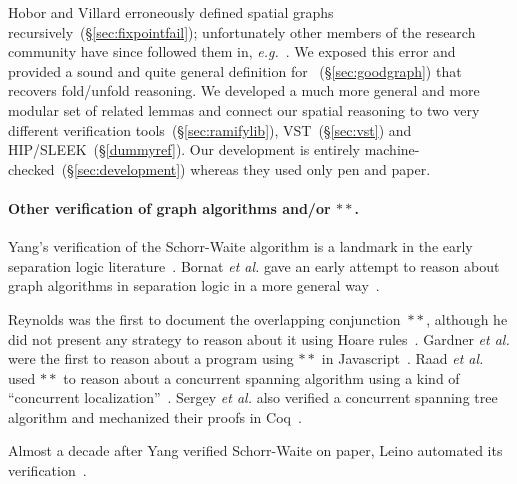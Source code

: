 Hobor and Villard erroneously defined spatial graphs 
recursively~(\S\ref{sec:fixpointfail}); unfortunately other members of the research 
community have since followed them in, \emph{e.g.}~\cite{raadvg15}.  We exposed this 
error and provided a sound and quite general definition for 
~(\S\ref{sec:goodgraph}) that recovers fold/unfold reasoning.  We developed a 
much more general and more modular set of related lemmas and connect our spatial 
reasoning to two very different verification tools~(\S\ref{sec:ramifylib}), 
VST~(\S\ref{sec:vst}) and HIP/SLEEK~(\S\ref{dummyref}).  Our development is entirely 
machine-checked~(\S\ref{sec:development}) whereas they used only pen and paper.
\fi

\paragraph{Other verification of graph algorithms and/or $**$.}
Yang's verification of the Schorr-Waite algorithm is a landmark in the early separation 
logic literature~\cite{hongseok:phd}.  Bornat \emph{et al.} gave an early attempt to 
reason about graph algorithms in separation logic in a more general 
way~\cite{bornat:aliasing04}.

Reynolds was the first to document the overlapping conjunction~$**$, although he did not 
present any strategy to reason about it using Hoare rules~\cite{rey-slnotes}.  
Gardner \emph{et al.} were the first to reason about a program using $**$ in 
Javascript~\cite{gardnerms12}.  Raad \emph{et al.} used $**$ to reason about a 
concurrent spanning algorithm using a kind of 
``concurrent localization''~\cite{raadvg15}.  Sergey \emph{et al.} also verified a 
concurrent spanning tree algorithm and mechanized their proofs in Coq~\cite{ilya-graphs}.

Almost a decade after Yang verified Schorr-Waite on paper, Leino automated 
its verification~\cite{leino10}.


